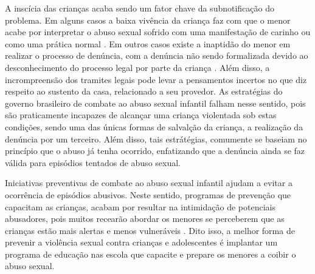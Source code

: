 A inscícia das crianças acaba sendo um fator chave da subnotificação do problema. Em alguns casos a baixa vivência da criança faz com que o menor acabe por interpretar o abuso sexual sofrido com uma manifestação de carinho ou como uma prática normal \cite{aded2006abuso}. Em outros casos existe a inaptidão do menor em realizar o processo de denúncia, com a denúncia não sendo formalizada devido ao desconhecimento do processo legal por parte da criança \cite{krug2002world}. Além disso, a incrompreensão dos tramites legais pode levar a pensamentos incertos no que diz respeito ao sustento da casa, relacionado a seu provedor. As estratégias do governo brasileiro de combate ao abuso sexual infantil falham nesse sentido, pois são praticamente incapazes de alcançar uma criança violentada sob estas condições, sendo uma das únicas formas de salvalção da criança, a realização da denúncia por um terceiro. Além disso, tais estrátégias, comumente se baseiam no princípio que o abuso já tenha ocorrido, enfatizando que a denúncia ainda se faz válida para episódios tentados de abuso sexual.


Iniciativas preventivas de combate ao abuso sexual infantil ajudam a evitar a ocorrência de episódios abusivos. Neste sentido, programas de prevenção que capacitam as crianças, acabam por resultar na intimidação de potenciais abusadores, pois muitos recearão abordar os menores se perceberem que as crianças estão mais alertas e menos vulneráveis \cite{maria2010papel}. Dito isso, a melhor forma de prevenir a violência sexual contra crianças e adolescentes é implantar um programa de educação nas escola que capacite e prepare os menores a coibir o abuso sexual.%



